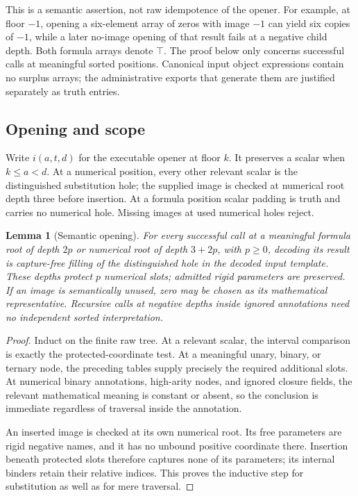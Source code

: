 \documentclass[11pt,letterpaper]{article}
\newtheorem{lemma}[theorem]{Lemma}
\theoremstyle{definition}\newtheorem{definition}[theorem]{Definition}
\theoremstyle{remark}\newtheorem{remark}[theorem]{Remark}
\begin{document}
This is a semantic assertion, not raw idempotence of the opener.
For example, at floor $-1$, opening a six-element array of zeros with
image $-1$ can yield six copies of $-1$, while a later no-image opening
of that result fails at a negative child depth.  Both formula arrays
denote $\top$.  The proof below only concerns successful calls at meaningful
sorted positions.  Canonical input object expressions contain no surplus
arrays; the administrative exports that generate them are justified
separately as truth entries.

\subsection{Opening and scope}
\label{subsec:opening-lemma}

Write $i(a,t,d)$ for the executable opener at floor $k$.  It preserves a
scalar when $k\leq a<d$.  At a numerical position, every other relevant
scalar is the distinguished substitution hole; the supplied image is
checked at numerical root depth three before insertion.  At a formula
position scalar padding is truth and carries no numerical hole.
Missing images at used numerical holes reject.

\begin{lemma}[Semantic opening]
\label{lem:semantic-opening}
For every successful call at a meaningful formula root of depth $2p$
or numerical root of depth $3+2p$, with $p\geq0$, decoding its result
is capture-free filling of the distinguished hole in the decoded input
template.  These depths protect $p$ numerical slots; admitted rigid
parameters are preserved.  If an image is semantically unused, zero
may be chosen as its mathematical representative.  Recursive calls
at negative depths inside ignored annotations need no independent
sorted interpretation.
\end{lemma}

\begin{proof}
Induct on the finite raw tree.  At a relevant scalar, the interval
comparison is exactly the protected-coordinate test.  At a meaningful
unary, binary, or ternary node, the preceding tables supply precisely
the required additional slots.  At numerical binary annotations,
high-arity nodes, and ignored closure fields, the relevant mathematical
meaning is constant or absent, so the conclusion is immediate
regardless of traversal inside the annotation.

An inserted image is checked at its own numerical root.  Its free
parameters are rigid negative names, and it has no unbound positive
coordinate there.  Insertion beneath protected slots therefore captures
none of its parameters; its internal binders retain their relative
indices.  This proves the inductive step for substitution as well as
for mere traversal.
\end{proof}
\end{document}

